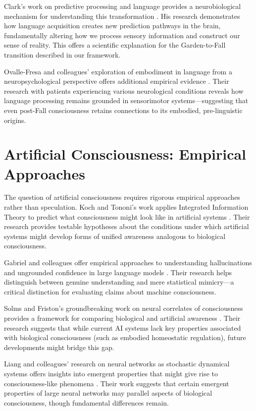 Clark's work on predictive processing and language provides a neurobiological mechanism for understanding this transformation \parencite{clark2023predictive}. His research demonstrates how language acquisition creates new prediction pathways in the brain, fundamentally altering how we process sensory information and construct our sense of reality. This offers a scientific explanation for the Garden-to-Fall transition described in our framework.

Ovalle-Fresa and colleagues' exploration of embodiment in language from a neuropsychological perspective offers additional empirical evidence \parencite{ovalle2024exploration}. Their research with patients experiencing various neurological conditions reveals how language processing remains grounded in sensorimotor systems—suggesting that even post-Fall consciousness retains connections to its embodied, pre-linguistic origins.

\section{Artificial Consciousness: Empirical Approaches}

The question of artificial consciousness requires rigorous empirical approaches rather than speculation. Koch and Tononi's work applies Integrated Information Theory to predict what consciousness might look like in artificial systems \parencite{koch2024consciousness}. Their research provides testable hypotheses about the conditions under which artificial systems might develop forms of unified awareness analogous to biological consciousness.

Gabriel and colleagues offer empirical approaches to understanding hallucinations and ungrounded confidence in large language models \parencite{gabriel2024empirical}. Their research helps distinguish between genuine understanding and mere statistical mimicry—a critical distinction for evaluating claims about machine consciousness.

Solms and Friston's groundbreaking work on neural correlates of consciousness provides a framework for comparing biological and artificial awareness \parencite{solms2025neural}. Their research suggests that while current AI systems lack key properties associated with biological consciousness (such as embodied homeostatic regulation), future developments might bridge this gap.

Liang and colleagues' research on neural networks as stochastic dynamical systems offers insights into emergent properties that might give rise to consciousness-like phenomena \parencite{liang2024neural}. Their work suggests that certain emergent properties of large neural networks may parallel aspects of biological consciousness, though fundamental differences remain.

